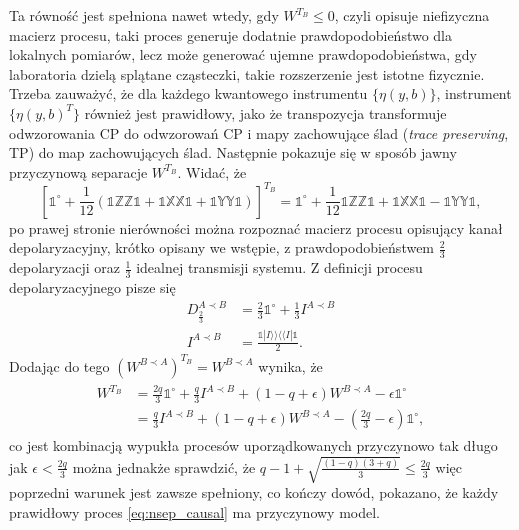 \documentclass[10pt]{article} %
\newcommand{\BBra}[1]{\langle\langle#1|}
\newcommand{\KKet}[1]{|#1\rangle\rangle}
\newcommand{\X}{\mathbb{X}}
\newcommand{\Y}{\mathbb{Y}}
\newcommand{\Z}{\mathbb{Z}}
\newcommand{\I}{\mathbb{1}}
\newcommand{\IO}{\mathbb{1}^\circ}
\begin{document}
Ta równość jest spełniona nawet wtedy, gdy $W^{T_B} \leq 0$, czyli opisuje niefizyczna macierz procesu, taki proces generuje dodatnie prawdopodobieństwo dla lokalnych pomiarów, lecz może generować ujemne prawdopodobieństwa, gdy laboratoria dzielą splątane cząsteczki, takie rozszerzenie jest istotne fizycznie.
Trzeba zauważyć, że dla każdego kwantowego instrumentu $\{ \eta(y,b) \}$, instrument $\{ \eta(y,b)^T \}$ również jest prawidłowy, jako że transpozycja transformuje odwzorowania CP do odwzorowań CP i mapy zachowujące ślad (\textit{trace preserving}, TP) do map zachowujących ślad. Następnie pokazuje się w sposób jawny przyczynową
separacje $W^{T_B}$. Widać, że 
\begin{equation}
\left[\IO + \frac{1}{12}\left(\I\Z\Z\I + \I\X\X\I + \I\Y\Y\I\right)\right]^{T_B} = \IO + \frac{1}{12}\I\Z\Z\I + \I\X\X\I - \I\Y\Y\I, 
\end{equation}
po prawej stronie nierówności można rozpoznać macierz procesu opisujący kanał depolaryzacyjny, krótko opisany we wstępie, z prawdopodobieństwem $\frac{2}{3}$ depolaryzacji oraz $\frac{1}{3}$ idealnej transmisji systemu.
Z definicji procesu depolaryzacyjnego pisze się
\begin{align}
D^{A \prec B}_{\frac{2}{3}} &= \frac{2}{3} \IO + \frac{1}{3}I^{A \prec B}  \\
I^{A \prec B} &= \frac{\I\KKet{I}\BBra{I}\I}{2}.
\end{align} Dodając do tego $\left(W^{B \prec A}\right)^{T_B} = W^{B \prec A}$
wynika, że 
\begin{align}
\label{eq:wtb_sep}
\begin{split}
W^{T_B} &= \frac{2q}{3}\IO + \frac{q}{3} I^{A \prec B} + (1-q+\epsilon)W^{B \prec A} - \epsilon \IO \\
 &= \frac{q}{3} I^{A \prec B} + (1-q+\epsilon) W^{B \prec A} - (\frac{2q}{3} - \epsilon) \IO,
\end{split}
\end{align} co jest kombinacją wypukła procesów uporządkowanych przyczynowo tak długo jak $\epsilon < \frac{2q}{3}$ można jednakże sprawdzić, że $q - 1 + \sqrt{\frac{(1-q)(3+q)}{3}} \leq \frac{2q}{3}$ więc poprzedni warunek jest zawsze spełniony, co kończy dowód, pokazano, że każdy prawidłowy proces \eqref{eq:nsep_causal} ma przyczynowy model.
\end{document}
